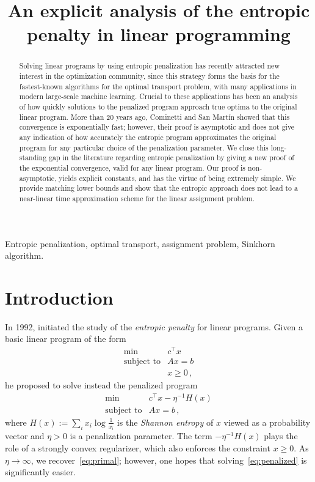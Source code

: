 \documentclass[final,12pt]{colt2018}
\title[The entropic penalty in linear programming]{An explicit analysis of the entropic penalty in linear programming}
\newcommand{\1}{\mathds{1}}
\newcommand*{\ent}[1]{H(#1)}
\begin{document}
\maketitle

\begin{abstract}
Solving linear programs by using entropic penalization has recently attracted new interest in the optimization community, since this strategy forms the basis for the fastest-known algorithms for the optimal transport problem, with many applications in modern large-scale machine learning.
Crucial to these applications has been an analysis of how quickly solutions to the penalized program approach true optima to the original linear program.
More than 20 years ago, Cominetti and San Mart\'in showed that this convergence is exponentially fast; however, their proof is asymptotic and does not give any indication of how accurately the entropic program approximates the original program for any particular choice of the penalization parameter.
We close this long-standing gap in the literature regarding entropic penalization by giving a new proof of the exponential convergence, valid for any linear program.
Our proof is non-asymptotic, yields explicit constants, and has the virtue of being extremely simple.
We provide matching lower bounds and show that the entropic approach does not lead to a near-linear time approximation scheme for the linear assignment problem.
\end{abstract}

\begin{keywords}
Entropic penalization, optimal transport, assignment problem, Sinkhorn algorithm.
\end{keywords}

\section{Introduction}
In 1992, \citeauthor{Fan92} initiated the study of the \emph{entropic penalty} for linear programs.
Given a basic linear program of the form
\begin{equation}\tag{LP}\label{eq:primal}
\begin{array}{rl}
\min & c^\top x  \\
\text{subject to}& Ax  = b \\
& x  \geq 0\,,
\end{array}
\end{equation}
he proposed to solve instead the penalized program
\begin{equation}\tag{Pen}\label{eq:penalized}
\begin{array}{rl}
\min & c^\top x  - \eta^{-1} \ent{x}\\
\text{subject to}& Ax  = b\,,
\end{array}
\end{equation}
where $\ent{x} := \sum_i x_i \log \frac{1}{x_i}$ is the \emph{Shannon entropy} of $x$ viewed as a probability vector and $\eta > 0$ is a penalization parameter.
The term $- \eta^{-1} \ent{x}$ plays the role of a strongly convex regularizer, which also enforces the constraint $x \geq 0$.
As $\eta \to \infty$, we recover~\eqref{eq:primal}; however, one hopes that solving~\eqref{eq:penalized} is significantly easier.
\end{document}
